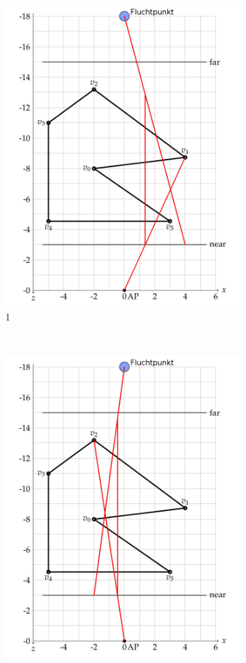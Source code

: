 \documentclass[a4paper,10pt,DIV=14]{article}
\begin{document}
\begin{figure}[H]
\begin{subfigure}{0.3\textwidth}
		\includegraphics[width=\textwidth]{2b_1}
		\caption{1}
	\end{subfigure}
	~
	\begin{subfigure}{0.3\textwidth}
		\includegraphics[width=\textwidth]{2b_2}

\end{subfigure}
\end{figure}
\end{document}
